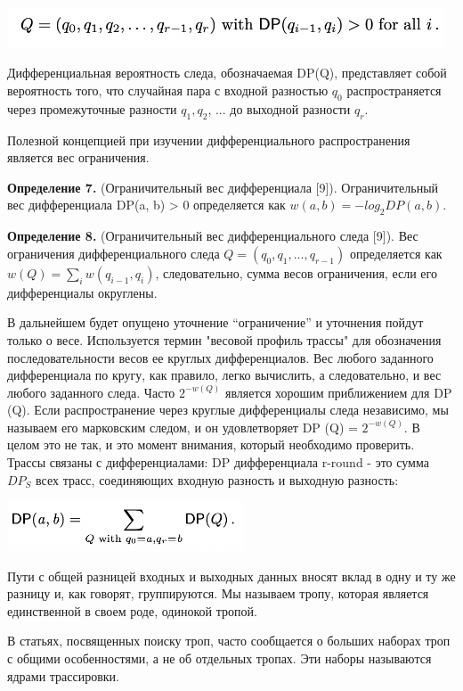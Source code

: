\documentclass[utf8,14pt,a4paper,oneside,russian]{book}
\begin{document}
\includegraphics[width=13cm]{form21}

Дифференциальная вероятность следа, обозначаемая DP(Q), представляет 
собой вероятность того, что случайная пара с входной разностью $q_0$ 
распространяется через промежуточные разности $q_1, q_2$, ... до выходной 
разности $q_r$.

Полезной концепцией при изучении дифференциального распространения 
является вес ограничения. 

\textbf{Определение 7.} (Ограничительный вес дифференциала [9]). 
Ограничительный вес дифференциала DP(a, b) > 0 определяется как 
$w(a, b) = - log_2 DP(a, b)$.

\textbf{Определение 8.} (Ограничительный вес дифференциального следа [9]). 
Вес ограничения дифференциального следа $Q = (q_0, q_1, . . . , q_{r-1})$ 
определяется как $w(Q) = \sum_i w(q_{i-1}, q_i)$, следовательно, 
сумма весов ограничения, если его дифференциалы округлены.


В дальнейшем будет опущено уточнение “ограничение” и уточнения пойдут 
только о весе. Используется термин "весовой профиль трассы" для обозначения 
последовательности весов ее круглых дифференциалов. Вес любого заданного 
дифференциала по кругу, как правило, легко вычислить, а следовательно, и 
вес любого заданного следа. Часто $2^{-w (Q)}$ является хорошим приближением для 
DP (Q). Если распространение через круглые дифференциалы следа независимо, 
мы называем его марковским следом, и он удовлетворяет DP (Q) = $2^{-w (Q)}$. 
В целом это не так, и это момент внимания, который необходимо проверить. 
Трассы связаны с дифференциалами: DP дифференциала r-round - это сумма $DP_S$ 
всех трасс, соединяющих входную разность и выходную разность:

\includegraphics[width=7cm]{form22}

Пути с общей разницей входных и выходных данных вносят вклад в одну и ту же 
разницу и, как говорят, группируются. Мы называем тропу, которая является 
единственной в своем роде, одинокой тропой.

В статьях, посвященных поиску троп, часто сообщается о больших наборах 
троп с общими особенностями, а не об отдельных тропах. Эти наборы называются 
ядрами трассировки.
\end{document}
